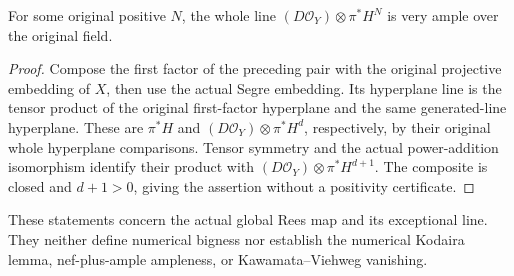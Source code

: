 \begin{corollary}
\label{cor:kn-nadel-nef-big-same-global-twist-very-ample}
\notready
{}
For some original positive $N$, the whole line
$(D\mathcal O_Y)\otimes\pi^*H^N$ is very ample over the original field.
\end{corollary}
\begin{proof}
Compose the first factor of the preceding pair with the original
projective embedding of $X$, then use the actual Segre embedding.
Its hyperplane line is the tensor product of the original first-factor
hyperplane and the same generated-line hyperplane.  These are
$\pi^*H$ and $(D\mathcal O_Y)\otimes\pi^*H^d$, respectively, by their
original whole hyperplane comparisons.  Tensor symmetry and the actual
power-addition isomorphism identify their product with
$(D\mathcal O_Y)\otimes\pi^*H^{d+1}$.  The composite is closed and
$d+1>0$, giving the assertion without a positivity certificate.
\end{proof}

These statements concern the actual global Rees map and its exceptional
line.  They neither define numerical bigness nor establish the numerical
Kodaira lemma, nef-plus-ample ampleness, or Kawamata--Viehweg vanishing.
